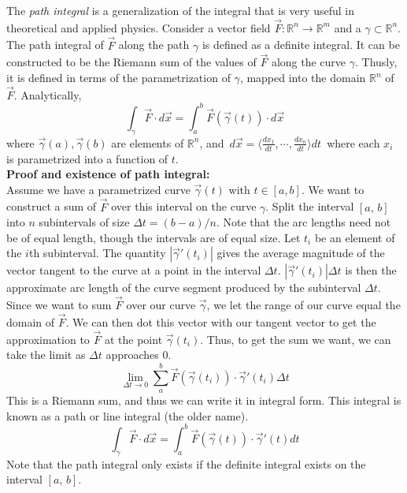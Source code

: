 \documentclass{article}
\begin{document}
 

The \emph{path integral} is a generalization of the integral that is very useful in theoretical and applied physics. Consider a vector field $\vec{F}\!:\mathbb{R}^n\rightarrow\mathbb{R}^m$ and a  $\gamma\subset\mathbb{R}^n$. The path integral of $\vec{F}$ along the path $\gamma$ is defined as a definite integral. It can be constructed to be the Riemann sum of the values of $\vec{F}$ along the curve $\gamma$. Thusly, it is defined in terms of the parametrization of $\gamma$, mapped into the domain $\mathbb{R}^n$ of $\vec{F}$. Analytically,
$$\int_\gamma \vec{F}\cdot d\vec{x} = \int_a^b \vec{F}(\vec{\gamma}(t))\cdot d\vec{x}$$
where $\vec{\gamma}(a), \vec{\gamma}(b)$ are elements of $\mathbb{R}^n$, and\, $d\vec{x}=\langle\frac{dx_1}{dt},\cdots,\frac{dx_n}{dt}\rangle dt$\, where each $x_i$ is parametrized into a function of $t$.\\

\textbf{Proof and existence of path integral:}\\
Assume we have a parametrized curve $\vec{\gamma}(t)$ with $t\in[a,b]$. We want to construct a sum of $\vec{F}$ over this interval on the curve $\gamma$. Split the interval $[a,\,b]$ into $n$ subintervals of size $\Delta t=(b-a)/n$. Note that the arc lengths need not be of equal length, though the intervals are of equal size. Let $t_i$ be an element of the $i$th subinterval. The quantity $|\vec{\gamma}'(t_i)|$ gives the average magnitude of the vector tangent to the curve at a point in the interval $\Delta t$. $|\vec{\gamma}'(t_i)|\Delta t$ is then the approximate arc length of the curve segment produced by the subinterval $\Delta t$. Since we want to sum $\vec{F}$ over our curve $\vec{\gamma}$, we let the range of our curve equal the domain of $\vec{F}$. We can then dot this vector with our tangent vector to get the approximation to $\vec{F}$ at the point $\vec{\gamma}(t_i)$. Thus, to get the sum we want, we can take the limit as $\Delta t$ approaches 0.
$$\lim_{\Delta t\rightarrow 0}\sum_a^b \vec{F}(\vec{\gamma}(t_i))\cdot\vec{\gamma}'(t_i)\Delta t$$
This is a Riemann sum, and thus we can write it in integral form. This integral is known as a path or line integral (the older name).
$$\int_\gamma \vec{F}\cdot d\vec{x} = \int_a^b \vec{F}(\vec{\gamma}(t))\cdot\vec{\gamma}'(t)dt$$
Note that the path integral only exists if the definite integral exists on the interval $[a,\,b]$.\\
\end{document}

